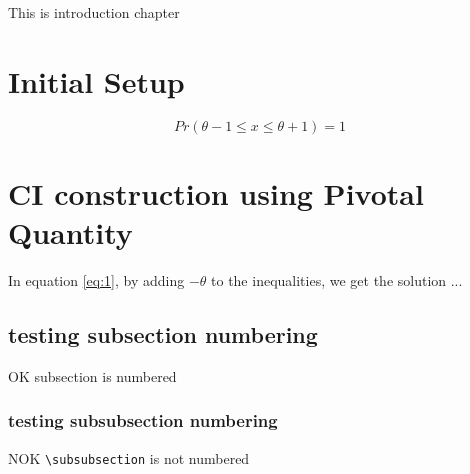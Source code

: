 \documentclass[tikz = true, float=false, crop=false, 11pt]{standalone}
\begin{document}
    \label{ch:chapter_1}
    
    This is introduction chapter     

    \section{Initial Setup} 
      \begin{equation}\label{eq:1}
      Pr(\theta-1 \leq x \leq \theta+1) = 1  
      \end{equation}
      
    \section{CI construction using Pivotal Quantity}
      In equation \ref{eq:1}, by adding $-\theta$ to the inequalities, we get the solution
    ...
    	\subsection{testing subsection numbering}
    	OK subsection is numbered   	
    	
    	\subsubsection{testing subsubsection numbering}
    	NOK \verb|\subsubsection| is not numbered
    	
    
\end{document}
